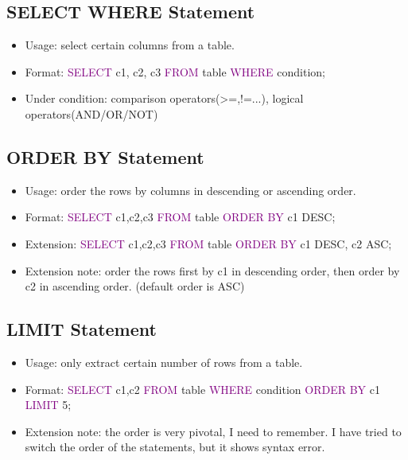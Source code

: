 \documentclass[a4paper]{article}
\begin{document}
\subsection{SELECT WHERE Statement}
\begin{itemize}
  \item Usage: select certain columns from a table.
  \item Format: \textcolor{purple}{SELECT} c1, c2, c3 \textcolor{purple}{FROM} table \textcolor{purple}{WHERE} condition;
  \item Under condition: comparison operators(>=,!=...), logical operators(AND/OR/NOT)
\end{itemize}

\subsection{ORDER BY Statement}
\begin{itemize}
  \item Usage: order the rows by columns in descending or ascending order.
  \item Format: \textcolor{purple}{SELECT} c1,c2,c3 \textcolor{purple}{FROM} table \textcolor{purple}{ORDER BY} c1 DESC;
  \item Extension: \textcolor{purple}{SELECT} c1,c2,c3 \textcolor{purple}{FROM} table \textcolor{purple}{ORDER BY} c1 DESC, c2 ASC;
  \item Extension note: order the rows first by c1 in descending order, then order by c2 in ascending order. (default order is ASC)
\end{itemize}

\subsection{LIMIT Statement}
\begin{itemize}
  \item Usage: only extract certain number of rows from a table.
  \item Format: \textcolor{purple}{SELECT} c1,c2 \textcolor{purple}{FROM} table \textcolor{purple}{WHERE} condition \textcolor{purple}{ORDER BY} c1 \textcolor{purple}{LIMIT} 5;
  \item Extension note: the order is very pivotal, I need to remember. I have tried to switch the order of the statements, but it shows syntax error. 
\end{itemize}
\end{document}
